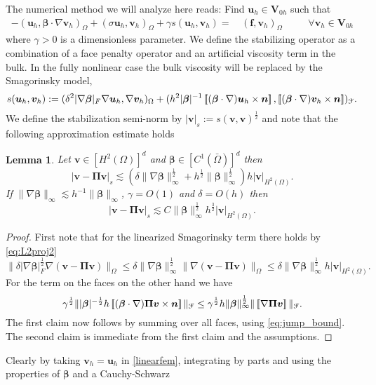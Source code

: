 \documentclass[10pt]{amsart}
\numberwithin{equation}{section}
\newtheorem{lemma}[theorem]{Lemma}
\theoremstyle{definition}
\theoremstyle{remark}
\renewcommand{\(}{\bigl(}
\renewcommand{\)}{\bigr)}
\newcommand{\jump}[1]{\left[\hspace{-0.025in}\left[#1\right]\hspace{-0.025in}\right]}
\newcommand{\bld}[1]{\boldsymbol{#1}}
\newcommand{\bv}{\bld{v}}
\newcommand{\bn}{\bld{n}}
\newcommand{\bu}{\bld{u}}
\newcommand{\bff}{\bld{f}}
\newcommand{\bV}{\bld{V}}
\newcommand{\bPi}{\bld{\Pi}}
\newcommand{\bbeta}{{\bm \beta}}
\begin{document}
The numerical method we will analyze here reads: Find $\bu_h \in \bV_{0h}$ such that
\begin{subequations}\label{linearfem}
\begin{alignat}{2}
-(\bu_h, \bbeta \cdot \nabla \bv_h)_\Omega+(\sigma \bu_h,
\bv_h)_\Omega +\gamma s(\bu_h,\bv_h)=&\, (\bff,\bv_h)_\Omega \quad && \forall \bv_h \in \bV_{0h}
\end{alignat}
\end{subequations}
where $\gamma>0$ is a dimensionless parameter.
We define the stabilizing operator as a combination of a face penalty
operator and an artificial viscosity term in the bulk. In the fully
nonlinear case the bulk viscosity will be replaced by the Smagorinsky model,
\[
 s(\bu_h,\bv_h):= (\delta^2 |\nabla \bbeta|_F \nabla \bu_h,\nabla
 \bv_h)_\Omega+ ( h^{2}|\bbeta|^{-1}
 \jump{(\bbeta \cdot \nabla )\bu_h\times \bn} ,
 \jump{(\bbeta \cdot \nabla) \bv_h \times \bn})_{\mathcal{F}}.
\]
We define the stabilization semi-norm by $|\bv|_s :=
s(\bv,\bv)^{\frac12}$ and note that the following approximation
estimate holds
\begin{lemma}\label{lem:stab_approx}
Let $\bv \in [H^2(\Omega)]^d$ and $\bbeta \in [C^{1}(\bar \Omega)]^d$ then
\[
|\bv - \bPi \bv|_s  \lesssim (\delta \|\nabla
\bbeta\|_{\infty}^{\frac12}+ h^{\frac12} \|
\bbeta\|^{\frac12}_{\infty})
h |\bv|_{H^2(\Omega)}.
\]
If $\|\nabla
\bbeta\|_{\infty}\lesssim h^{-1} \|
\bbeta\|_{\infty}$, $\gamma = O(1)$ and $\delta = O(h)$ then
\[
|\bv - \bPi \bv|_s  \lesssim C \|
\bbeta\|^{\frac12}_{\infty}
h^{\frac32} |\bv|_{H^2(\Omega)}.
\]
\end{lemma}
\begin{proof}
First note that for the linearized Smagorinsky term there holds by \eqref{eq:L2proj2}
\[
\|\delta |\nabla \bbeta|_F^{\frac12} \nabla (\bv - \bPi \bv)\|_\Omega \leq
\delta \|\nabla \bbeta\|_\infty^{\frac12} \|\nabla (\bv - \bPi \bv)\|_\Omega
\leq \delta \|\nabla \bbeta\|_\infty^{\frac12} h |\bv|_{H^2(\Omega)}.
\]
For the term on the faces on the other hand we have
\[
\gamma^{\frac12}\||\bbeta|^{-\frac12} h \jump{(\bbeta \cdot \nabla
  )\bPi\bv\times \bn}\|_{\mathcal{F}} \leq \gamma^{\frac12} h
\|\bbeta\|^{\frac12}_\infty \|\jump{\nabla\bPi\bv}\|_{\mathcal{F}} .
\]
The first claim now follows by summing over all faces, using
\eqref{eq:jump_bound}. The second claim is immediate from the first claim and the assumptions.
\end{proof}
%
Clearly by taking $\bv_h = \bu_h$ in
\eqref{linearfem}, integrating by
parts and using the properties of $\bbeta$ and a Cauchy-Schwarz
\end{document}
